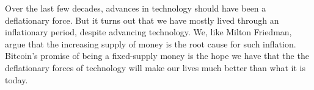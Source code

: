 Over the last few decades, advances in technology should have been a deflationary force. But it turns out that we have mostly lived through an inflationary period, despite advancing technology. We, like Milton Friedman, argue that the increasing supply of money is the root cause for such inflation. Bitcoin's promise of being a fixed-supply money is the hope we have that the the deflationary forces of technology will make our lives much better than what it is today.
